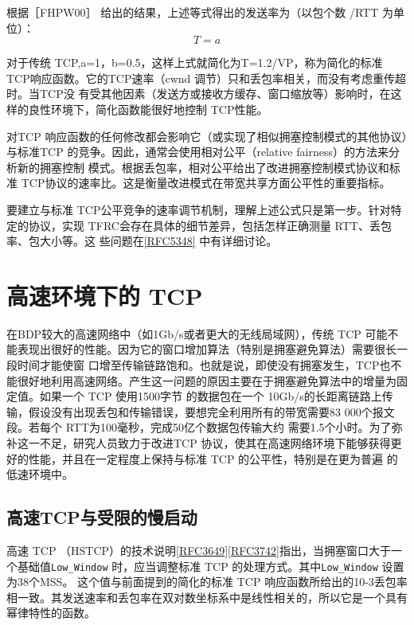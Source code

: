 根据［FHPW00］ 给出的结果，上述等式得出的发送率为（以包个数 /RTT 为单位）：
\begin{equation}
    T = a
\end{equation}

对于传统 TCP,a=1，b=0.5，这样上式就简化为T=1.2/VP，称为简化的标准 TCP响应函数。它的TCP速率（cwnd 调节）只和丢包率相关，而没有考虑重传超时。当TCP没
有受其他因素（发送方或接收方缓存、窗口缩放等）影响时，在这样的良性环境下，简化函数能很好地控制 TCP性能。

对TCP 响应函数的任何修改都会影响它（或实现了相似拥塞控制模式的其他协议）与标准TCP 的竞争。因此，通常会使用相对公平（relative fairness）的方法来分析新的拥塞控制
模式。根据丢包率，相对公平给出了改进拥塞控制模式协议和标准 TCP协议的速率比。这是衡量改进模式在带宽共享方面公平性的重要指标。

要建立与标准 TCP公平竞争的速率调节机制，理解上述公式只是第一步。针对特定的协议，实现 TFRC会存在具体的细节差异，包括怎样正确测量 RTT、丢包率、包大小等。这
些问题在\href{https://www.rfc-editor.org/rfc/rfc5348}{[RFC5348]} 中有详细讨论。

\section{高速环境下的 TCP}

在BDP较大的高速网络中（如1Gb/s或者更大的无线局域网），传统 TCP 可能不能表现出很好的性能。因为它的窗口增加算法（特别是拥塞避免算法）需要很长一段时间才能使窗
口增至传输链路饱和。也就是说，即使没有拥塞发生，TCP也不能很好地利用高速网络。产生这一问题的原因主要在于拥塞避免算法中的增量为固定值。如果一个 TCP 使用1500字节
的数据包在一个 10Gb/s的长距离链路上传输，假设没有出现丢包和传输错误，要想完全利用所有的带宽需要83 000个报文段。若每个 RTT为100毫秒，完成50亿个数据包传输大约
需要1.5个小时。为了弥补这一不足，研究人员致力于改进TCP 协议，使其在高速网络环境下能够获得更好的性能，并且在一定程度上保持与标准 TCP 的公平性，特别是在更为普遍
的低速环境中。

\subsection{高速TCP与受限的慢启动}
高速 TCP （HSTCP）的技术说明\href{https://www.rfc-editor.org/rfc/rfc3649}{[RFC3649]}\href{https://www.rfc-editor.org/rfc/rfc3742}{[RFC3742]}指出，当拥塞窗口大于一个基础值\verb|Low_Window| 时，应当调整标准 TCP 的处理方式。其中\verb|Low_Window| 设置为38个MSS。
这个值与前面提到的简化的标准 TCP 响应函数所给出的10-3丢包率相一致。其发送速率和丢包率在双对数坐标系中是线性相关的，所以它是一个具有幂律特性的函数。

